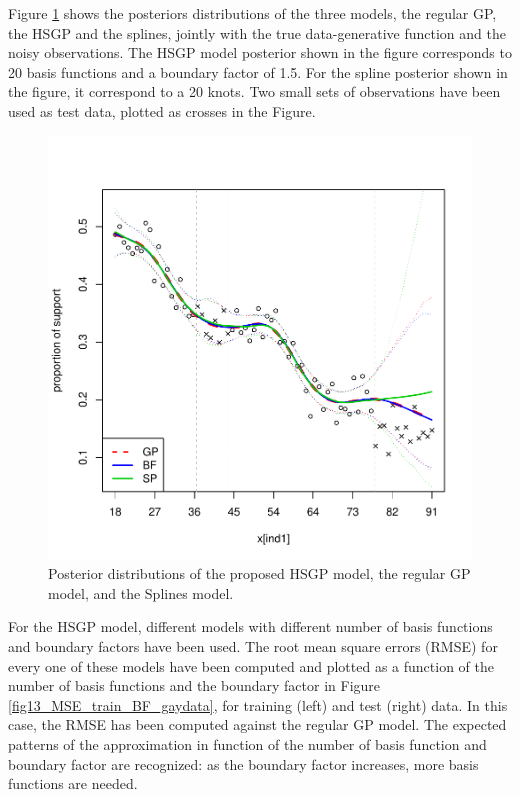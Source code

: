 \documentclass[]{interact}
\theoremstyle{plain}%
\theoremstyle{definition}
\theoremstyle{remark}
\begin{document}
Figure \ref{fig12_Posteriors_gaydata} shows the posteriors distributions of the three models, the regular GP, the HSGP and the splines, jointly with the true data-generative function and the noisy observations. The HSGP model posterior shown in the figure corresponds to 20 basis functions and a boundary factor of 1.5. For the spline posterior shown in the figure, it correspond to a 20 knots. Two small sets of observations have been used as test data, plotted as crosses in the Figure. 

\begin{figure}[H]
\centering
\includegraphics[scale=0.50]{fig12_Posteriors_gaydata.pdf}
\caption{Posterior distributions of the proposed HSGP model, the regular GP model, and the Splines model.}
  \label{fig12_Posteriors_gaydata}
\end{figure}

For the HSGP model, different models with different number of basis functions and boundary factors have been used. The root mean square errors (RMSE) for every one of these models have been computed and plotted as a function of the number of basis functions and the boundary factor in Figure \ref{fig13_MSE_train_BF_gaydata}, for training (left) and test (right) data. In this case, the RMSE has been computed against the regular GP model. The expected patterns of the approximation in function of the number of basis function and boundary factor are recognized: as the boundary factor increases, more basis functions are needed.
\end{document}
